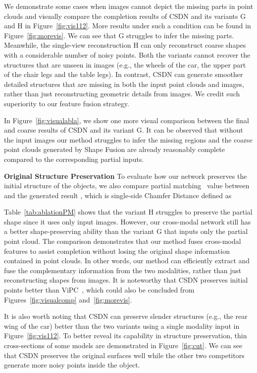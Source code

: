 We demonstrate some cases when images cannot depict the missing parts in point clouds and visually compare the completion results of CSDN and its variants G and H in Figure~\ref{fig:vis112}. More results under such a condition can be found in Figure~\ref{fig:morevis}. 
We can see that G struggles to infer the missing parts. Meanwhile, the single-view reconstruction H can only reconstruct coarse shapes with a considerable number of noisy points. Both the variants cannot recover the structures that are unseen in images (e.g., the wheels of the car, the upper part of the chair legs and the table legs). 
In contrast, CSDN can generate smoother detailed structures that are missing in both the input point clouds and images, rather than just reconstructing geometric details from images. We credit such superiority to our feature fusion strategy.

In Figure~\ref{fig:visualabla}, we show one more visual comparison between the final and coarse results of CSDN and its variant G. It can be observed that without the input images our method struggles to infer the missing regions and the coarse point clouds generated by Shape Fusion are already reasonably complete compared to the corresponding partial inputs.

\textbf{Original Structure Preservation}
To evaluate how our network preserves the initial structure of the objects, we also compare partial matching~\cite{wen2021cycle4completion} value between  and the generated result , which is single-side Chamfer Distance defined as

Table~\ref{tab:ablationPM} shows that the variant H struggles to preserve the partial shape since it uses only input images. 
However, our cross-modal network still has a better shape-preserving ability than the variant G that inputs only the partial point cloud. The comparison demonstrates that our method fuses cross-modal features to assist completion without losing the original shape information contained in point clouds. In other words, our method can efficiently extract and fuse the complementary information from the two modalities, rather than just reconstructing shapes from images. 
It is noteworthy that CSDN preserves initial points better than ViPC~\cite{zhang2021view}, which could also be concluded from Figures~\ref{fig:visualcomp} and~\ref{fig:morevis}.

It is also worth noting that CSDN can preserve slender structures (e.g., the rear wing of the car) better than the two variants using a single modality input in Figure~\ref{fig:vis112}. To better reveal its capability in structure preservation, thin cross-sections of some models are demonstrated in Figure~\ref{fig:cut}. We can see that CSDN preserves the original surfaces well while the other two competitors~\cite{zhang2021view,yu2021pointr} generate more noisy points inside the object.

